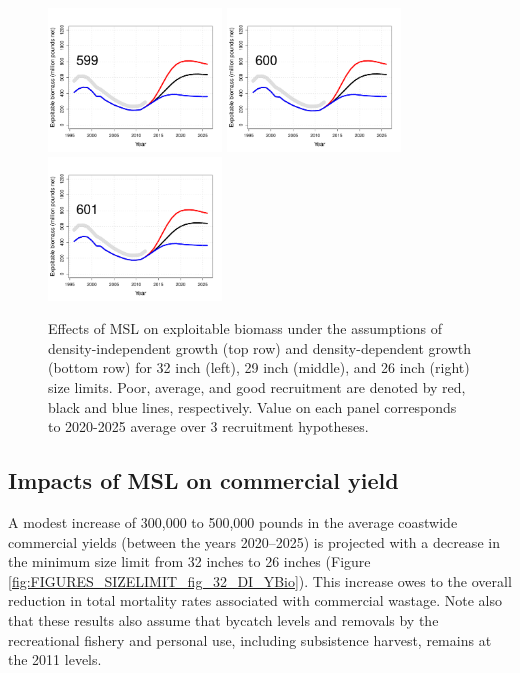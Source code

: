 \begin{figure}[htbp]
		\includegraphics[height=1.5in]{../FIGURES/SIZELIMIT/fig_32_DD_EBio.pdf}
		\includegraphics[height=1.5in]{../FIGURES/SIZELIMIT/fig_29_DD_EBio.pdf}
		\includegraphics[height=1.5in]{../FIGURES/SIZELIMIT/fig_26_DD_EBio.pdf}
	\caption{Effects of MSL on exploitable biomass under the assumptions of density-independent growth (top row) and density-dependent growth (bottom row) for 32 inch (left), 29 inch (middle), and 26 inch (right) size limits.  Poor, average, and good recruitment are denoted by red, black and blue lines, respectively.  Value on each panel corresponds to 2020-2025 average over 3 recruitment hypotheses.}
	\label{fig:FIGURES_SIZELIMIT_fig_32_DI_EBio}
\end{figure}

\subsection{Impacts of MSL on commercial yield} %
\label{sub:impacts_of_msl_on_commercial_yield}
A modest increase of 300,000 to 500,000 pounds in the  average coastwide commercial yields (between the years 2020--2025) is projected with a decrease in the minimum size limit from 32 inches to 26 inches (Figure \ref{fig:FIGURES_SIZELIMIT_fig_32_DI_YBio}).  This increase owes to the overall reduction in total mortality rates associated with commercial wastage.  Note also that these results also assume that bycatch levels and removals by the recreational fishery and personal use, including subsistence harvest, remains at the 2011 levels.


